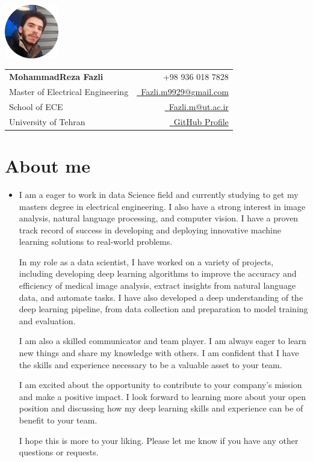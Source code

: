 \documentclass[a4paper,11pt]{article}
\makeatletter
\newcommand{\name}{MohammadReza Fazli} %
\newcommand{\course}{Master of Electrical Engineering} %
\newcommand{\phone}{936 018 7828} %
\newcommand{\emaila}{Fazli.m9929@gmail.com} %
\newcommand{\emailb}{Fazli.m@ut.ac.ir} %
\makeatother
\begin{document}
\selectfont


\parbox{2.6cm}{%
\includegraphics[width=2.35cm,clip]{my_pic.png}
}
\parbox{\dimexpr\linewidth-2.9cm\relax}{
\begin{tabularx}{\linewidth}{L r} \\
  \textbf{\Large \name} & {\raisebox{0.0\height}{\footnotesize \faPhone}\ +98 \phone}\\
  \course & \href{mailto:\emaila}{\raisebox{0.0\height}{\footnotesize \faEnvelope}\ {\emaila}} \\
  {School of ECE} &  \href{mailto:\emailb}{\raisebox{0.0\height}{\footnotesize \faEnvelope}\ {\emailb}}\\
  {University of Tehran} &  \href{https://github.com/fazli-m9929/}{\raisebox{0.0\height}{\footnotesize \faGithub}\ {GitHub Profile}} \\
\end{tabularx}
}


\section{\textbf{About me}}
  \justifying
  \begin{itemize}[leftmargin=0.1in, label={}]
    \item{
      I am a eager to work in data Science field and currently studying to get my masters degree in electrical engineering. I also have a strong interest in image analysis, natural language processing, and computer vision.
      I have a proven track record of success in developing and deploying innovative machine learning solutions to real-world problems.

      In my role as a data scientist, I have worked on a variety of projects, including developing deep learning algorithms to improve the accuracy and efficiency of medical image analysis, extract insights from natural language data, and automate tasks.
      I have also developed a deep understanding of the deep learning pipeline, from data collection and preparation to model training and evaluation.

      I am also a skilled communicator and team player.
      I am always eager to learn new things and share my knowledge with others.
      I am confident that I have the skills and experience necessary to be a valuable asset to your team.

      I am excited about the opportunity to contribute to your company's mission and make a positive impact.
      I look forward to learning more about your open position and discussing how my deep learning skills and experience can be of benefit to your team.

      I hope this is more to your liking. Please let me know if you have any other questions or requests.
    }
 \end{itemize}
 \vspace{-16pt}
\end{document}
